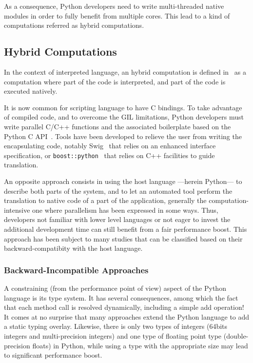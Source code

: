 \documentclass{llncs}
\begin{document}
As a consequence, Python developers need to write multi-threaded native
modules in order to fully benefit from multiple cores. This lead to a kind of
computations referred as hybrid computations.



\subsection{Hybrid Computations}

In the context of interpreted language, an hybrid computation is defined
in~\cite{dongara2007} as a computation where part of the code is interpreted,
and part of the code is executed natively.

It is now common for scripting language to have C bindings. To take advantage of
compiled code, and to overcome the GIL limitations, Python developers must write
parallel C/C++ functions and the associated boilerplate based on the Python C
API~\cite{pythoncapi}. Tools have been developed to relieve the user from
writing the encapsulating code, notably Swig~\cite{swig2003} that relies on an
enhanced interface specification, or
\texttt{boost::python}~\cite{boostpython2007} that relies on C++ facilities to
guide translation.

An opposite approach consists in using the host language ---herein Python---
to describe both parts of the system, and to let an automated tool perform the
translation to native code of a part of the application, generally the
computation-intensive one where parallelism has been expressed in some ways.
Thus, developers not familiar with lower level languages or not eager to invest
the additional development time can still benefit from a fair performance boost.
This approach has been subject to many studies that can be classified based on
their backward-compatibity with the host language.

\subsubsection{Backward-Incompatible Approaches}

A constraining (from the performance point of view) aspect of the Python
language is its type system. It has several consequences, among which the fact
that each method call is resolved dynamically, including a simple add
operation! It comes at no surprise that many approaches extend the Python
language to add a static typing overlay. Likewise, there is only two types of
integers (64bits integers and multi-precision integers) and one type of floating
point type (double-precision floats) in Python, while using a type with the
appropriate size may lead to significant performance boost.
\end{document}

